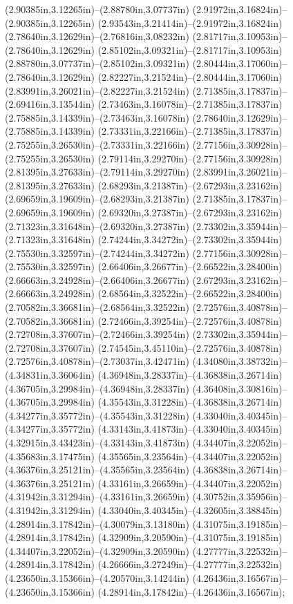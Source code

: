 (2.90385in,3.12265in)--(2.88780in,3.07737in) (2.91972in,3.16824in)--(2.90385in,3.12265in) (2.93543in,3.21414in)--(2.91972in,3.16824in) (2.78640in,3.12629in)--(2.76816in,3.08232in) (2.81717in,3.10953in)--(2.78640in,3.12629in) (2.85102in,3.09321in)--(2.81717in,3.10953in) (2.88780in,3.07737in)--(2.85102in,3.09321in) (2.80444in,3.17060in)--(2.78640in,3.12629in) (2.82227in,3.21524in)--(2.80444in,3.17060in) (2.83991in,3.26021in)--(2.82227in,3.21524in) (2.71385in,3.17837in)--(2.69416in,3.13544in) (2.73463in,3.16078in)--(2.71385in,3.17837in) (2.75885in,3.14339in)--(2.73463in,3.16078in) (2.78640in,3.12629in)--(2.75885in,3.14339in) (2.73331in,3.22166in)--(2.71385in,3.17837in) (2.75255in,3.26530in)--(2.73331in,3.22166in) (2.77156in,3.30928in)--(2.75255in,3.26530in) (2.79114in,3.29270in)--(2.77156in,3.30928in) (2.81395in,3.27633in)--(2.79114in,3.29270in) (2.83991in,3.26021in)--(2.81395in,3.27633in) (2.68293in,3.21387in)--(2.67293in,3.23162in) (2.69659in,3.19609in)--(2.68293in,3.21387in) (2.71385in,3.17837in)--(2.69659in,3.19609in) (2.69320in,3.27387in)--(2.67293in,3.23162in) (2.71323in,3.31648in)--(2.69320in,3.27387in) (2.73302in,3.35944in)--(2.71323in,3.31648in) (2.74244in,3.34272in)--(2.73302in,3.35944in) (2.75530in,3.32597in)--(2.74244in,3.34272in) (2.77156in,3.30928in)--(2.75530in,3.32597in) (2.66406in,3.26677in)--(2.66522in,3.28400in) (2.66663in,3.24928in)--(2.66406in,3.26677in) (2.67293in,3.23162in)--(2.66663in,3.24928in) (2.68564in,3.32522in)--(2.66522in,3.28400in) (2.70582in,3.36681in)--(2.68564in,3.32522in) (2.72576in,3.40878in)--(2.70582in,3.36681in) (2.72466in,3.39254in)--(2.72576in,3.40878in) (2.72708in,3.37607in)--(2.72466in,3.39254in) (2.73302in,3.35944in)--(2.72708in,3.37607in) (2.74545in,3.45110in)--(2.72576in,3.40878in) (2.72576in,3.40878in)--(2.73037in,3.42471in) (4.34080in,3.38732in)--(4.34831in,3.36064in) (4.36948in,3.28337in)--(4.36838in,3.26714in) (4.36705in,3.29984in)--(4.36948in,3.28337in) (4.36408in,3.30816in)--(4.36705in,3.29984in) (4.35543in,3.31228in)--(4.36838in,3.26714in) (4.34277in,3.35772in)--(4.35543in,3.31228in) (4.33040in,3.40345in)--(4.34277in,3.35772in) (4.33143in,3.41873in)--(4.33040in,3.40345in) (4.32915in,3.43423in)--(4.33143in,3.41873in) (4.34407in,3.22052in)--(4.35683in,3.17475in) (4.35565in,3.23564in)--(4.34407in,3.22052in) (4.36376in,3.25121in)--(4.35565in,3.23564in) (4.36838in,3.26714in)--(4.36376in,3.25121in) (4.33161in,3.26659in)--(4.34407in,3.22052in) (4.31942in,3.31294in)--(4.33161in,3.26659in) (4.30752in,3.35956in)--(4.31942in,3.31294in) (4.33040in,3.40345in)--(4.32605in,3.38845in) (4.28914in,3.17842in)--(4.30079in,3.13180in) (4.31075in,3.19185in)--(4.28914in,3.17842in) (4.32909in,3.20590in)--(4.31075in,3.19185in) (4.34407in,3.22052in)--(4.32909in,3.20590in) (4.27777in,3.22532in)--(4.28914in,3.17842in) (4.26666in,3.27249in)--(4.27777in,3.22532in) (4.23650in,3.15366in)--(4.20570in,3.14244in) (4.26436in,3.16567in)--(4.23650in,3.15366in) (4.28914in,3.17842in)--(4.26436in,3.16567in);
